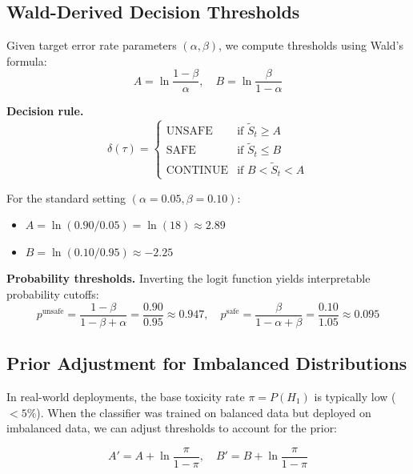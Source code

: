 \documentclass[acmtjournal, acmnowidth]{acmart}
\newcommand{\Hone}{H_1}
\theoremstyle{definition}
\begin{document}
\subsection{Wald-Derived Decision Thresholds}

Given target error rate parameters $(\alpha, \beta)$, we compute thresholds using Wald's formula:
\begin{equation}
A = \ln\frac{1-\beta}{\alpha}, \quad B = \ln\frac{\beta}{1-\alpha}
\label{eq:thresholds}
\end{equation}

\textbf{Decision rule.}
\begin{equation}
\delta(\tau) = \begin{cases}
\text{UNSAFE} & \text{if } \tilde{S}_t \geq A \\
\text{SAFE} & \text{if } \tilde{S}_t \leq B \\
\text{CONTINUE} & \text{if } B < \tilde{S}_t < A
\end{cases}
\label{eq:decision}
\end{equation}

For the standard setting $(\alpha=0.05, \beta=0.10)$:
\begin{itemize}
    \item $A = \ln(0.90/0.05) = \ln(18) \approx 2.89$
    \item $B = \ln(0.10/0.95) \approx -2.25$
\end{itemize}

\textbf{Probability thresholds.} Inverting the logit function yields interpretable probability cutoffs:
\begin{equation}
p^{\text{unsafe}} = \frac{1-\beta}{1-\beta+\alpha} = \frac{0.90}{0.95} \approx 0.947, \quad
p^{\text{safe}} = \frac{\beta}{1-\alpha+\beta} = \frac{0.10}{1.05} \approx 0.095
\label{eq:prob_thresholds}
\end{equation}

\subsection{Prior Adjustment for Imbalanced Distributions}
\label{sec:prior_adjustment}

In real-world deployments, the base toxicity rate $\pi = P(\Hone)$ is typically low ($<5\%$). When the classifier was trained on balanced data but deployed on imbalanced data, we can adjust thresholds to account for the prior:

\begin{equation}
A' = A + \ln\frac{\pi}{1-\pi}, \quad B' = B + \ln\frac{\pi}{1-\pi}
\label{eq:adjusted_thresholds}
\end{equation}
\end{document}
